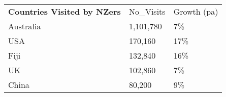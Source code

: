\begin{tabular}[t]{p{5cm}p{1.3cm}p{1.2cm}}
 \textbf{Countries Visited by NZers} & No\_Visits & Growth (pa) \\ 
 Australia & 1,101,780 & 7\% \\ 
  USA &   170,160 & 17\% \\ 
  Fiji &   132,840 & 16\% \\ 
  UK &   102,860 & 7\% \\ 
  China &    80,200 & 9\% \\ 
  \end{tabular}

